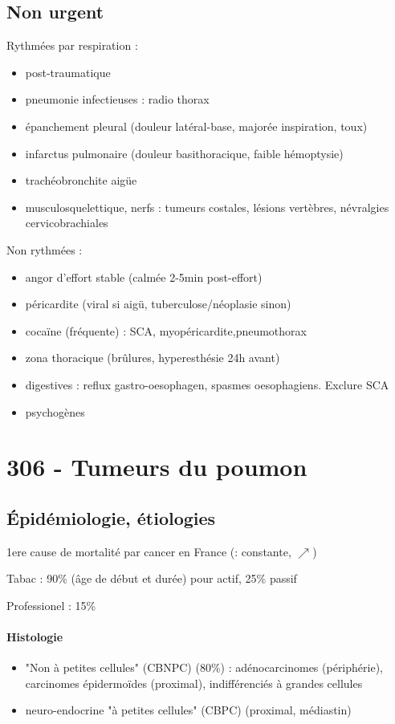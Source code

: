 \subsection{Non urgent}
Rythmées par respiration :
\begin{itemize}
\item post-traumatique
\item pneumonie infectieuses : radio thorax
\item épanchement pleural (douleur latéral-base, majorée inspiration, toux)
\item infarctus pulmonaire (douleur basithoracique, faible hémoptysie)
\item trachéobronchite aigüe
\item musculosquelettique, nerfs : tumeurs costales, lésions vertèbres,
  névralgies cervicobrachiales
\end{itemize}
Non rythmées :
\begin{itemize}
\item angor d'effort stable (calmée 2-5min post-effort)
\item péricardite (viral si aigü, tuberculose/néoplasie sinon)
\item cocaïne (fréquente) : SCA, myopéricardite,pneumothorax
\item zona thoracique (brûlures, hyperesthésie 24h avant)
\item digestives : reflux gastro-oesophagen, spasmes oesophagiens. Exclure SCA
  \skull
\item psychogènes
\end{itemize}

\section{306 - Tumeurs du poumon}%
\label{sec:306_tumeurs_du_poumon}

\subsection{Épidémiologie, étiologies}
1ere cause de mortalité par cancer en France (\male : constante, \female
$\nearrow$)

Tabac : 90\% (âge de début et durée) pour actif, 25\% passif

Professionel : 15\%

\paragraph{Histologie}
\begin{itemize}
\item "Non à petites cellules" (CBNPC) (80\%) : adénocarcinomes (périphérie),
  carcinomes épidermoïdes (proximal), indifférenciés à grandes cellules
\item neuro-endocrine "à petites cellules" (CBPC) (proximal, médiastin)
\end{itemize}

